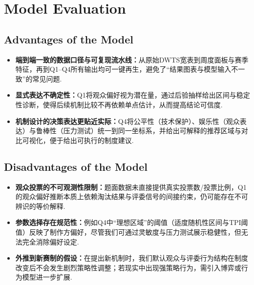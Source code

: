 \section{Model Evaluation}

\subsection{Advantages of the Model}%

\begin{itemize}
	
	
	\item[(1)] \textbf{端到端一致的数据口径与可复现流水线：}从原始DWTS宽表到周度面板与赛季特征，再到Q1--Q4所有输出均可一键再生，避免了“结果图表与模型输入不一致”的常见问题.
	
	\item[(2)] \textbf{显式表达不确定性：}Q1将观众偏好视为潜在量，通过后验抽样给出区间与稳定性诊断，使得后续机制比较不再依赖单点估计，从而提高结论可信度.
	
	\item[(3)] \textbf{机制设计的决策表达更贴近实际：}Q4将公平性（技术保护）、娱乐性（观众表达）与鲁棒性（压力测试）统一到同一坐标系，并给出可解释的推荐区域与对比可视化，便于给出可执行的制度建议.
	
\end{itemize}	

\subsection{Disadvantages of the Model}

\begin{itemize}
	
	\item[(1)] \textbf{观众投票的不可观测性限制：}题面数据未直接提供真实投票数/投票比例，Q1的观众偏好推断本质上依赖淘汰结果与评委信号的间接约束，仍可能存在不可辨识的等价解释.
	
	\item[(2)] \textbf{参数选择存在规范性：}例如Q4中“理想区域”的阈值（适度随机性区间与TPI阈值）反映了制作方偏好，尽管我们可通过灵敏度与压力测试展示稳健性，但无法完全消除偏好设定.
	
	\item[(3)] \textbf{外推到新赛制的假设：}在提出新机制时，我们默认观众与评委行为结构在制度改变后不会发生剧烈策略性调整；若现实中出现强策略行为，需引入博弈或行为模型进一步扩展.
	
\end{itemize}	

